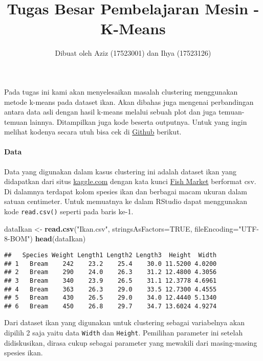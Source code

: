 \documentclass[
]{article}
\title{Tugas Besar Pembelajaran Mesin - K-Means}
\author{Dibuat oleh Aziz (17523001) dan Ihya (17523126)}
\date{}
\newenvironment{Shaded}{\begin{snugshade}}{\end{snugshade}}
\newcommand{\DataTypeTok}[1]{\textcolor[rgb]{0.13,0.29,0.53}{#1}}
\newcommand{\KeywordTok}[1]{\textcolor[rgb]{0.13,0.29,0.53}{\textbf{#1}}}
\newcommand{\NormalTok}[1]{#1}
\newcommand{\OtherTok}[1]{\textcolor[rgb]{0.56,0.35,0.01}{#1}}
\newcommand{\StringTok}[1]{\textcolor[rgb]{0.31,0.60,0.02}{#1}}
\begin{document}
\maketitle

Pada tugas ini kami akan menyelesaikan masalah clustering menggunakan
metode k-means pada dataset ikan. Akan dibahas juga mengenai
perbandingan antara data asli dengan hasil k-means melalui sebuah plot
dan juga temuan-temuan lainnya. Ditampilkan juga kode beserta outputnya.
Untuk yang ingin melihat kodenya secara utuh bisa cek di
\href{https://github.com/AchmadNoer/tubes_K-Means}{Github} berikut.

\hypertarget{data}{%
\paragraph{Data}\label{data}}

Data yang digunakan dalam kasus clustering ini adalah dataset ikan yang
didapatkan dari situs \href{https://www.kaggle.com/datasets}{kaggle.com}
dengan kata kunci
\href{https://www.kaggle.com/aungpyaeap/fish-market}{Fish Market}
berformat csv. Di dalamnya terdapat kolom spesies ikan dan berbagai
macam ukuran dalam satuan centimeter. Untuk memuatnya ke dalam RStudio
dapat menggunakan kode \texttt{read.csv()} seperti pada baris ke-1.

\begin{Shaded}
\begin{Highlighting}[numbers=left,,]
\NormalTok{dataIkan <-}\StringTok{ }\KeywordTok{read.csv}\NormalTok{(}\StringTok{"Ikan.csv"}\NormalTok{, }\DataTypeTok{stringsAsFactors=}\OtherTok{TRUE}\NormalTok{, }\DataTypeTok{fileEncoding=}\StringTok{"UTF-8-BOM"}\NormalTok{)}
\KeywordTok{head}\NormalTok{(dataIkan)}
\end{Highlighting}
\end{Shaded}

\begin{verbatim}
##   Species Weight Length1 Length2 Length3  Height  Width
## 1   Bream    242    23.2    25.4    30.0 11.5200 4.0200
## 2   Bream    290    24.0    26.3    31.2 12.4800 4.3056
## 3   Bream    340    23.9    26.5    31.1 12.3778 4.6961
## 4   Bream    363    26.3    29.0    33.5 12.7300 4.4555
## 5   Bream    430    26.5    29.0    34.0 12.4440 5.1340
## 6   Bream    450    26.8    29.7    34.7 13.6024 4.9274
\end{verbatim}

Dari dataset ikan yang digunakan untuk clustering sebagai variabelnya
akan dipilih 2 saja yaitu data \texttt{Width} dan \texttt{Height}.
Pemilihan parameter ini setelah didiskusikan, dirasa cukup sebagai
parameter yang mewakili dari masing-masing spesies ikan.
\end{document}
